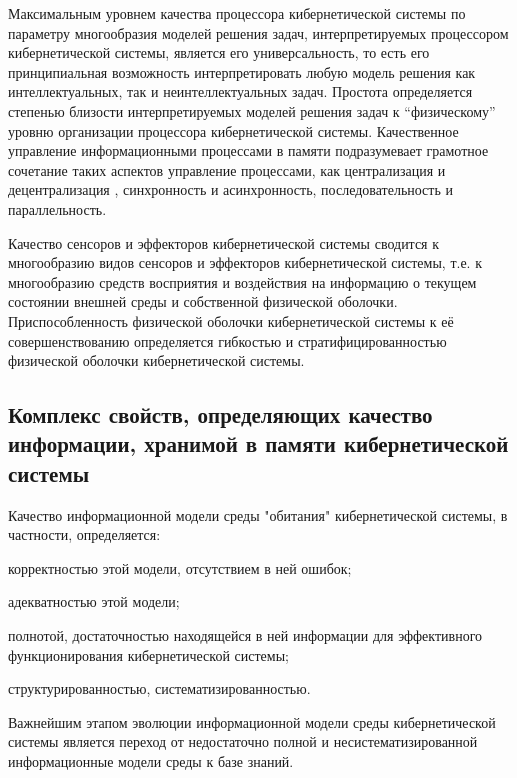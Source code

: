 Максимальным уровнем качества процессора кибернетической системы по параметру многообразия моделей решения задач, интерпретируемых процессором кибернетической системы, является его универсальность, то есть его принципиальная возможность интерпретировать любую модель решения как интеллектуальных, так и неинтеллектуальных задач. 
Простота определяется степенью близости интерпретируемых моделей решения задач к “физическому” уровню организации процессора кибернетической системы. 
Качественное управление информационными процессами в памяти подразумевает грамотное сочетание таких аспектов управление процессами, как централизация и децентрализация , синхронность и асинхронность, последовательность и параллельность.

Качество сенсоров и эффекторов кибернетической системы сводится к многообразию видов сенсоров и эффекторов кибернетической системы, т.е. к многообразию средств восприятия и воздействия на информацию о текущем состоянии внешней среды и собственной физической оболочки.
Приспособленность физической оболочки кибернетической системы к её совершенствованию определяется гибкостью и стратифицированностью физической оболочки кибернетической системы.



\subsection{Комплекс свойств, определяющих качество информации, хранимой в памяти кибернетической системы}
{\label{sec_cyb_syst_information_quality}} 

Качество информационной модели среды "обитания"{} кибернетической системы, в частности, определяется:
\begin{textitemize}
    \item корректностью этой модели, отсутствием в ней ошибок;
    \item адекватностью этой модели;
    \item полнотой, достаточностью находящейся в ней информации для эффективного функционирования кибернетической системы;
    \item структурированностью, систематизированностью.
\end{textitemize}

Важнейшим этапом эволюции информационной модели среды кибернетической системы является переход от недостаточно полной и несистематизированной информационные модели среды к базе знаний.

